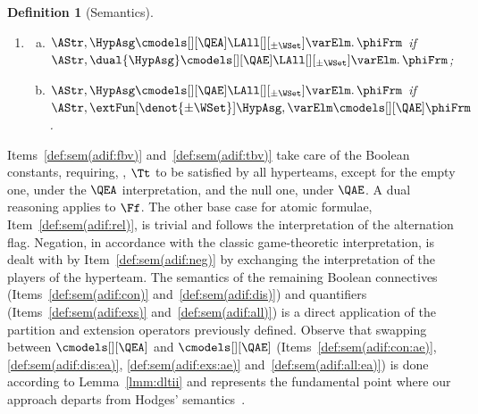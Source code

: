 \documentclass[authoryear]{elsarticle}
\newtheorem{definition}{Definition}
\begin{document}
\begin{definition}[\ADIF Semantics]
\begin{enumerate}[1)]
    \item\label{def:sem(adif:all)}
      \begin{enumerate}[a)]
        \item\label{def:sem(adif:all:ea)}
          $\AStr, \HypAsg \cmodels[][\QEA] \LAll[][_{\pm\WSet}] \varElm \ldotp
          \phiFrm$ if $\AStr, \dual{\HypAsg} \cmodels[][\QAE]
          \LAll[][_{\pm\WSet}] \varElm \ldotp \phiFrm$;
        \item\label{def:sem(adif:all:ae)}
          $\AStr, \HypAsg \cmodels[][\QAE] \LAll[][_{\pm\WSet}] \varElm \ldotp
          \phiFrm$ if $\AStr, \extFun[\denot{\pm\WSet}]{\HypAsg, \varElm}
          \cmodels[][\QAE] \phiFrm$.
      \end{enumerate}
  \end{enumerate}
\end{definition}

Items~\ref{def:sem(adif:fbv)} and~\ref{def:sem(adif:tbv)} take care of the
Boolean constants, requiring, \eg, $\Tt$ to be satisfied by all hyperteams,
except for the empty one, under the $\QEA$ interpretation, and the null one,
under $\QAE$.
A dual reasoning applies to $\Ff$.
The other base case for atomic formulae, Item~\ref{def:sem(adif:rel)}, is
trivial and follows the interpretation of the alternation flag.
Negation, in accordance with the classic game-theoretic interpretation, is dealt
with by Item~\ref{def:sem(adif:neg)} by exchanging the interpretation of the
players of the hyperteam.
The semantics of the remaining Boolean connectives
(Items~\ref{def:sem(adif:con)} and~\ref{def:sem(adif:dis)}) and quantifiers
(Items~\ref{def:sem(adif:exs)} and~\ref{def:sem(adif:all)}) is a direct
application of the partition and extension operators previously defined.
Observe that swapping between $\cmodels[][\QEA]$ and $\cmodels[][\QAE]$
(Items~\ref{def:sem(adif:con:ae)}, \ref{def:sem(adif:dis:ea)},
\ref{def:sem(adif:exs:ae)} and~\ref{def:sem(adif:all:ea)}) is done according to
Lemma~\ref{lmm:dltii} and represents the fundamental point where our approach
departs from Hodges' semantics~\citep{Hod97a,Hod97b}.
\end{document}
